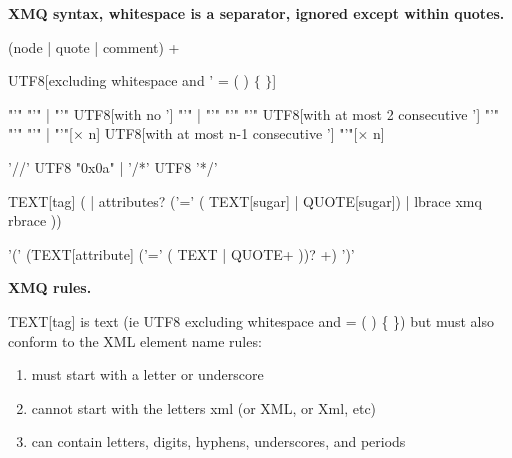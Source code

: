 \documentclass[10pt,a4paper]{article}
\begin{document}
\textbf{XMQ syntax, whitespace is a separator, ignored except within quotes.}

\raisebox{32pt}{xmq:}
\begin{minipage}{15cm}
\begin{rail}
  (node | quote | comment) +
\end{rail}
\end{minipage}

\raisebox{-4pt}{TEXT:}
\begin{minipage}{15cm}
\begin{rail}
UTF8[excluding whitespace and ' = ( ) $\lbrace$ $\rbrace$]
\end{rail}
\end{minipage}

\raisebox{32pt}{QUOTE:}
\begin{minipage}{15cm}
\begin{rail}
  "'" "'"
  | "'" UTF8[with no '] "'"
  | "'" "'" "'" UTF8[with at most 2 consecutive '] "'" "'" "'"
  | "'"[$\times$ n] UTF8[with at most n-1 consecutive '] "'"[$\times$ n]
\end{rail}
\end{minipage}

\raisebox{8pt}{COMMENT:}
\begin{minipage}{15cm}
\begin{rail}
  '//' UTF8 "0x0a"
  | '/*' UTF8 '*/'
\end{rail}
\end{minipage}

\raisebox{32pt}{node:}
\begin{minipage}{15cm}
\begin{rail}
  TEXT[tag] ( | attributes? ('=' ( TEXT[sugar] | QUOTE[sugar]) | lbrace xmq rbrace ))
\end{rail}
\end{minipage}

\raisebox{44pt}{attributes:}
\begin{minipage}{15cm}
\begin{rail}
'(' (TEXT[attribute] ('=' ( TEXT | QUOTE+ ))? +) ')'
\end{rail}
\end{minipage}

\newpage

\textbf{XMQ rules.}

TEXT[tag] is text (ie UTF8 excluding whitespace and = ( ) \{ \})
but must also conform to the XML element name rules:
\begin{enumerate}
  \item{must start with a letter or underscore}
  \item{cannot start with the letters xml (or XML, or Xml, etc)}
  \item{can contain letters, digits, hyphens, underscores, and periods}
\end{enumerate}
\end{document}
